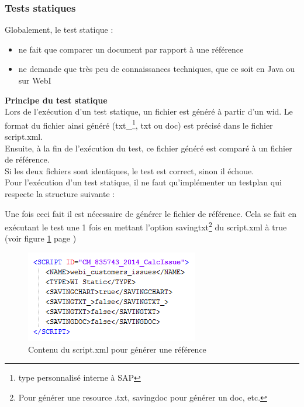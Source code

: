 \subsubsection{Tests statiques}
Globalement, le test statique :

\begin{itemize}
	\item ne fait que comparer un document par rapport \`{a} une r\'{e}f\'{e}rence
	\item ne demande que tr\`{e}s peu de connaissances techniques, que ce soit en Java ou sur WebI
\end{itemize}

\textbf{Principe du test statique}\hfill \\ \indent
Lors de l'ex\'{e}cution d'un test statique, un fichier est g\'{e}n\'{e}r\'{e} \`{a} partir d'un wid. Le format du fichier ainsi g\'{e}n\'{e}r\'{e} (txt\_\footnote{type personnalis\'{e} interne \`{a} SAP}, txt ou doc) est pr\'{e}cis\'{e} dans le fichier script.xml.\\
Ensuite, \`{a} la fin de l'ex\'{e}cution du test, ce fichier g\'{e}n\'{e}r\'{e} est compar\'{e} \`{a} un fichier de r\'{e}f\'{e}rence.\\
Si les deux fichiers sont identiques, le test est correct, sinon il \'{e}choue.\\
Pour l'ex\'{e}cution d'un test statique, il ne faut qu'impl\'{e}menter un testplan qui respecte la structure suivante :



Une fois ceci fait il est n\'{e}cessaire de g\'{e}n\'{e}rer le fichier de r\'{e}f\'{e}rence. Cela se fait en ex\'{e}cutant le test une 1 fois en mettant l'option savingtxt\footnote{Pour g\'{e}n\'{e}rer une resource .txt, savingdoc pour g\'{e}n\'{e}rer un doc, etc.} du script.xml \`{a} true (voir figure \ref{figure:scriptXmlSavingRef} page \pageref{figure:scriptXmlSavingRef})

\begin{figure}[!ht]
  \centering
      \includegraphics{images/scriptXmlSavingRef.png}
  \caption{Contenu du script.xml pour g\'{e}n\'{e}rer une r\'{e}f\'{e}rence}
	\label{figure:scriptXmlSavingRef}
\end{figure}

